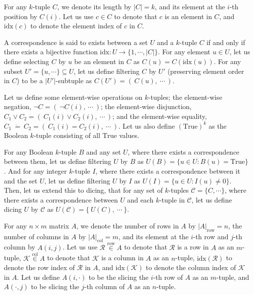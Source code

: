 \documentclass{article}
\begin{document}
For any \(k\)-tuple \(C\), we denote its length by \(|C| = k\), and its element at the \(i\)-th position by \(C(i)\). Let us use \(c \in C\) to denote that \(c\) is an element in \(C\), and \(\mathrm{idx}(c)\) to denote the element index of \(c\) in \(C\).

A correspondence is said to exists between a set \(U\) and a \(k\)-tuple \(C\) if and only if there exists a bijective function \(\mathrm{idx} : U \to \{1, \cdots, |C|\}\). For any element \(u \in U\), let us define selecting \(C\) by \(u\) be an element in \(C\) as \(C(u) = C(\mathrm{idx}(u))\). For any subset \(U' = \{u, \cdots\} \subseteq U\), let us define filtering \(C\) by \(U'\) (preserving element order in \(C\)) to be a \(|U'|\)-subtuple as \(C(U') = (\ C(u),\ \cdots\ )\).

Let us define some element-wise operations on \(k\)-tuples; the element-wise negation, \(\neg C = (\ \neg C(i),\ \cdots\ )\); the element-wise disjunction, \(C_1 \vee C_2 = (\ C_1(i) \vee C_2(i),\ \cdots\ )\); and the element-wise equality, \(C_1\ \ddot{=}\ C_2 = (\ C_1(i) = C_2(i),\ \cdots\ )\). Let us also define \((\mathrm{True})^k\) as the Boolean \(k\)-tuple consisting of all \(\mathrm{True}\) values.

For any Boolean \(k\)-tuple \(B\) and any set \(U\), where there exists a correspondence between them, let us define filtering \(U\) by \(B\) as \(U(B) = \{u \in U : B(u) = \mathrm{True}\}\). And for any integer \(k\)-tuple \(I\), where there exists a correspondence between it and the set \(U\), let us define filtering \(U\) by \(I\) as \(U(I) = \{u \in U : I(u) \neq 0\}\). Then, let us extend this to dicing, that for any set of \(k\)-tuples \(\mathcal{C} = \{C, \cdots\}\), where there exists a correspondence between \(U\) and each \(k\)-tuple in \(\mathcal{C}\), let us define dicing \(U\) by \(\mathcal{C}\) as \(U(\mathcal{C}) = \{\ U(C),\ \cdots\ \}\).

For any \(n \times m\) matrix \(A\), we denote the number of rows in \(A\) by \(|A|_{\mathrm{row}} = n\), the number of columns in \(A\) by \(|A|_{\mathrm{col}} = m\), and its element at the \(i\)-th row and \(j\)-th column by \(A(i, j)\). Let us use \(\mathcal{R} \overset{\mathrm{row}}{\in} A\) to denote that \(\mathcal{R}\) is a row in \(A\) as an \(m\)-tuple, \(\mathcal{K} \overset{\mathrm{col}}{\in} A\) to denote that \(\mathcal{K}\) is a column in \(A\) as an \(n\)-tuple, \(\mathrm{idx}(\mathcal{R})\) to denote the row index of \(\mathcal{R}\) in \(A\), and \(\mathrm{idx}(\mathcal{K})\) to denote the column index of \(\mathcal{K}\) in \(A\). Let us define \(A(i, \cdot)\) to be the slicing the \(i\)-th row of \(A\) as an \(m\)-tuple, and \(A(\cdot, j)\) to be slicing the \(j\)-th column of \(A\) as an \(n\)-tuple.
\end{document}
